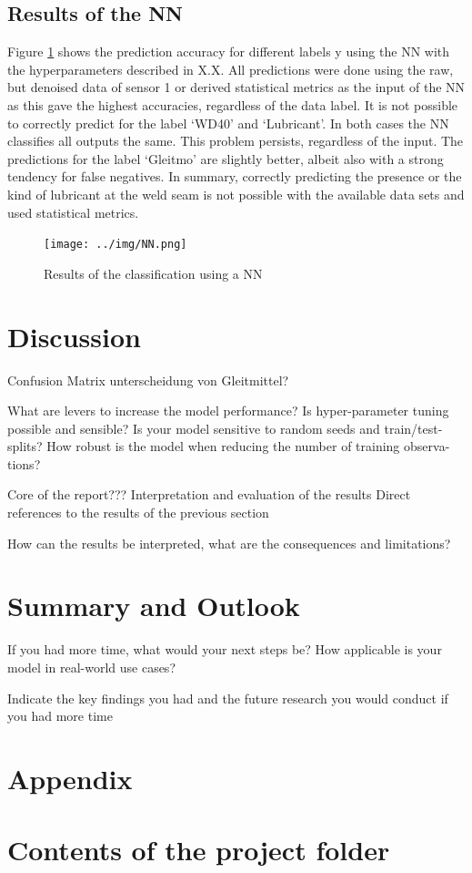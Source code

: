 \documentclass[12pt]{report}
\begin{document}
\section{Results of the NN}
Figure \ref{fig:NN} shows the prediction accuracy for different labels y using the NN with the hyperparameters described in X.X. All predictions were done using the raw, but denoised data of sensor 1 or derived statistical metrics as the input of the NN as this gave the highest accuracies, regardless of the data label.
It is not possible to correctly predict for the label ‘WD40’ and ‘Lubricant’. In both cases the NN classifies all outputs the same. This problem persists, regardless of the input.
The predictions for the label ‘Gleitmo’ are slightly better, albeit also with a strong tendency for false negatives. 
In summary, correctly predicting the presence or the kind of lubricant at the weld seam is not possible with the available data sets and used statistical metrics.

\begin{figure}[H]
	\texttt{[image: ../img/NN.png]}
	\caption{Results of the classification using a NN}
	\label{fig:NN}
\end{figure}

\chapter{Discussion}
Confusion Matrix
unterscheidung von Gleitmittel?

What are levers to increase the model performance? Is hyper-parameter tuning possible and
sensible? Is your model sensitive to random seeds and train/test-splits?
How robust is the model when reducing the number of training observa-
tions?

Core of the report???
Interpretation and evaluation of the results
Direct references to the results of the previous section

How can the results be interpreted, what are the consequences and
limitations?


\chapter{Summary and Outlook}
If you had more time, what would your next steps be? How applicable
is your model in real-world use cases?

Indicate the key findings you had and the future research you would
conduct if you had more time

\chapter{Appendix}
\printbibliography
\chapter{Contents of the project folder}
\end{document}
